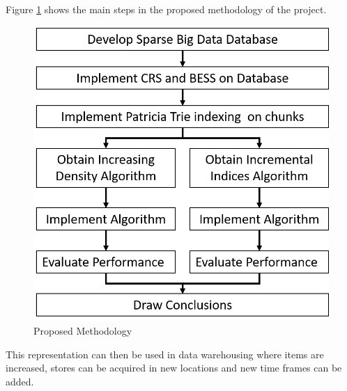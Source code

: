  Figure \ref{fig:proposedmethod} shows the main steps in the proposed methodology of the project.
 
 \begin{figure}[H]
 	\centering
 	\includegraphics[width=0.7\linewidth]{proposedMethod2}
 	\caption{Proposed Methodology}
 	\label{fig:proposedmethod}
 \end{figure}
 
This representation can then be used in data warehousing where items are increased, stores can be acquired in new locations and new time frames can be added.
